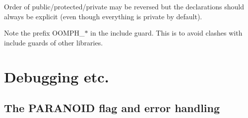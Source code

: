 


\begin{DoxyItemize}
\item Order of public/protected/private may be reversed but the declarations should always be explicit (even though everything is private by default).
\item Note the prefix {\ttfamily  O\+O\+M\+P\+H\+\_\+$\ast$} in the include guard. This is to avoid clashes with include guards of other libraries.
\end{DoxyItemize}



 

\hypertarget{index_debug}{}\section{Debugging etc.}\label{index_debug}
\hypertarget{index_paranoia}{}\subsection{The P\+A\+R\+A\+N\+O\+I\+D flag and error handling}\label{index_paranoia}


